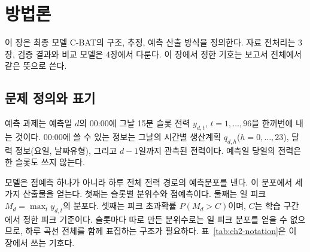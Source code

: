 \section{방법론}
\label{sec:ch2}

이 장은 최종 모델 C-BAT의 구조, 추정, 예측 산출 방식을 정의한다. 자료 전처리는 3장, 검증 결과와 비교 모델은 4장에서 다룬다. 이 장에서 정한 기호는 보고서 전체에서 같은 뜻으로 쓴다.

\subsection{문제 정의와 표기}
\label{sec:ch2-problem}

예측 과제는 예측일 $d$의 00:00에 그날 15분 슬롯 전력 $y_{d,t}$, $t=1,\dots,96$을 한꺼번에 내는 것이다. 00:00에 쓸 수 있는 정보는 그날의 시간별 생산계획 $q_{d,h}$($h=0,\dots,23$), 달력 정보(요일, 날짜유형), 그리고 $d-1$일까지 관측된 전력이다. 예측일 당일의 전력은 한 슬롯도 쓰지 않는다.

모델은 점예측 하나가 아니라 하루 전체 전력 경로의 예측분포를 낸다. 이 분포에서 세 가지 산출물을 얻는다. 첫째는 슬롯별 분위수와 점예측이다. 둘째는 일 피크 $M_d=\max_t y_{d,t}$의 분포다. 셋째는 피크 초과확률 $P(M_d > C)$이며, $C$는 학습 구간에서 정한 피크 기준이다. 슬롯마다 따로 만든 분위수로는 일 피크 분포를 얻을 수 없으므로, 하루 곡선 전체를 함께 표집하는 구조가 필요하다. 표~\ref{tab:ch2-notation}은 이 장에서 쓰는 기호다.

